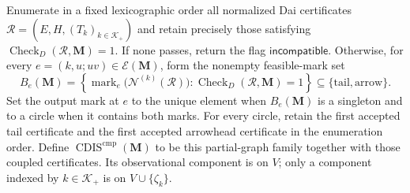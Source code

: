 Enumerate in a fixed lexicographic order all normalized Dai certificates \(\mathcal R=(E,H,(T_k)_{k\in\mathcal K_+})\) and retain precisely those satisfying \(\operatorname{Check}_{D}(\mathcal R,\mathbf M)=1\).  If none passes, return the flag \(\mathsf{incompatible}\).  Otherwise, for every \(e=(k,u;uv)\in\mathcal E(\mathbf M)\), form the nonempty feasible-mark set
\[
B_e(\mathbf M)=\left\{\operatorname{mark}_e\bigl(\mathcal N^{(k)}(\mathcal R)\bigr):\operatorname{Check}_{D}(\mathcal R,\mathbf M)=1\right\}\subseteq\{\mathrm{tail},\mathrm{arrow}\}.
\]
Set the output mark at \(e\) to the unique element when \(B_e(\mathbf M)\) is a singleton and to a circle when it contains both marks.  For every circle, retain the first accepted tail certificate and the first accepted arrowhead certificate in the enumeration order.  Define \(\operatorname{CDIS}^{\mathrm{cmp}}(\mathbf M)\) to be this partial-graph family together with those coupled certificates.  Its observational component is on \(V\); only a component indexed by \(k\in\mathcal K_+\) is on \(V\cup\{\zeta_k\}\).